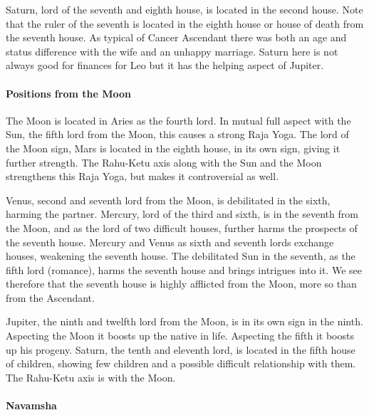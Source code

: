  

Saturn, lord of the seventh and eighth house, is located in the second house. Note that the ruler of the seventh is located in the eighth house or house of death from the seventh house. As typical of Cancer Ascendant there was both an age and status difference with the wife and an unhappy marriage. Saturn here is not always good for finances for Leo but it has the helping aspect of Jupiter.

 

\paragraph{Positions from the Moon}

 

The Moon is located in Aries as the fourth lord. In mutual full aspect with the Sun, the fifth lord from the Moon, this causes a strong Raja Yoga. The lord of the Moon sign, Mars is located in the eighth house, in its own sign, giving it further strength. The Rahu-Ketu axis along with the Sun and the Moon strengthens this Raja Yoga, but makes it controversial as well.

 

Venus, second and seventh lord from the Moon, is debilitated in the sixth, harming the partner. Mercury, lord of the third and sixth, is in the seventh from the Moon, and as the lord of two difficult houses, further harms the prospects of the seventh house. Mercury and Venus as sixth and seventh lords exchange houses, weakening the seventh house. The debilitated Sun in the seventh, as the fifth lord (romance), harms the seventh house and brings intrigues into it. We see therefore that the seventh house is highly afflicted from the Moon, more so than from the Ascendant.

 

 

Jupiter, the ninth and twelfth lord from the Moon, is in its own sign in the ninth. Aspecting the Moon it boosts up the native in life. Aspecting the fifth it boosts up his progeny. Saturn, the tenth and eleventh lord, is located in the fifth house of children, showing few children and a possible difficult relationship with them. The Rahu-Ketu axis is with the Moon.

 

\paragraph{Navamsha}

